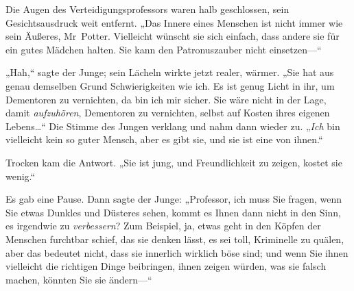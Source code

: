 Die Augen des Verteidigungsprofessors waren halb geschlossen, sein Gesichtsausdruck weit entfernt. „Das Innere eines Menschen ist nicht immer wie sein Äußeres, Mr~Potter. Vielleicht wünscht sie sich einfach, dass andere sie für ein gutes Mädchen halten. Sie kann den Patronuszauber nicht einsetzen—“

„Hah,“ sagte der Junge; sein Lächeln wirkte jetzt realer, wärmer. „Sie hat aus genau demselben Grund Schwierigkeiten wie ich. Es ist genug Licht in ihr, um Dementoren zu vernichten, da bin ich mir sicher. Sie wäre nicht in der Lage, damit \emph{aufzuhören}, Dementoren zu vernichten, selbst auf Kosten ihres eigenen Lebens…“ Die Stimme des Jungen verklang und nahm dann wieder zu. „\emph{Ich} bin vielleicht kein so guter Mensch, aber es gibt sie, und sie ist eine von ihnen.“

Trocken kam die Antwort. „Sie ist jung, und Freundlichkeit zu zeigen, kostet sie wenig.“

Es gab eine Pause. Dann sagte der Junge: „Professor, ich muss Sie fragen, wenn Sie etwas Dunkles und Düsteres sehen, kommt es Ihnen dann nicht in den Sinn, es irgendwie zu \emph{verbessern}? Zum Beispiel, ja, etwas geht in den Köpfen der Menschen furchtbar schief, das sie denken lässt, es sei toll, Kriminelle zu quälen, aber das bedeutet nicht, dass sie innerlich wirklich böse sind; und wenn Sie ihnen vielleicht die richtigen Dinge beibringen, ihnen zeigen würden, was sie falsch machen, könnten Sie sie ändern—“

